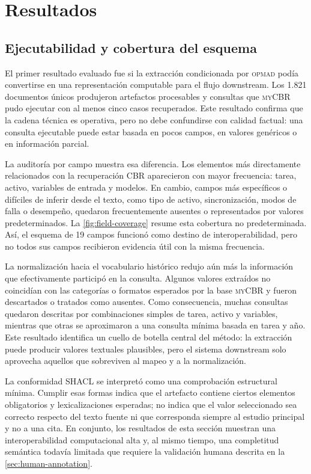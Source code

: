 \documentclass[11pt,a4paper]{article}
\newcommand{\OPMAD}{\textsc{opmad}}
\newcommand{\myCBR}{\textsc{myCBR}}
\begin{document}
\section{Resultados}
\label{sec:results}

\subsection{Ejecutabilidad y cobertura del esquema}

El primer resultado evaluado fue si la extracción condicionada por \OPMAD{} podía convertirse en una representación computable para el flujo downstream. Los 1.821 documentos únicos produjeron artefactos procesables y consultas que \myCBR{} pudo ejecutar con al menos cinco casos recuperados. Este resultado confirma que la cadena técnica es operativa, pero no debe confundirse con calidad factual: una consulta ejecutable puede estar basada en pocos campos, en valores genéricos o en información parcial.

La auditoría por campo muestra esa diferencia. Los elementos más directamente relacionados con la recuperación CBR aparecieron con mayor frecuencia: tarea, activo, variables de entrada y modelos. En cambio, campos más específicos o difíciles de inferir desde el texto, como tipo de activo, sincronización, modos de falla o desempeño, quedaron frecuentemente ausentes o representados por valores predeterminados. La \cref{fig:field-coverage} resume esta cobertura no predeterminada. Así, el esquema de 19 campos funcionó como destino de interoperabilidad, pero no todos sus campos recibieron evidencia útil con la misma frecuencia.

La normalización hacia el vocabulario histórico redujo aún más la información que efectivamente participó en la consulta. Algunos valores extraídos no coincidían con las categorías o formatos esperados por la base \myCBR{} y fueron descartados o tratados como ausentes. Como consecuencia, muchas consultas quedaron descritas por combinaciones simples de tarea, activo y variables, mientras que otras se aproximaron a una consulta mínima basada en tarea y año. Este resultado identifica un cuello de botella central del método: la extracción puede producir valores textuales plausibles, pero el sistema downstream solo aprovecha aquellos que sobreviven al mapeo y a la normalización.

La conformidad SHACL se interpretó como una comprobación estructural mínima. Cumplir esas formas indica que el artefacto contiene ciertos elementos obligatorios y lexicalizaciones esperadas; no indica que el valor seleccionado sea correcto respecto del texto fuente ni que corresponda siempre al estudio principal y no a una cita. En conjunto, los resultados de esta sección muestran una interoperabilidad computacional alta y, al mismo tiempo, una completitud semántica todavía limitada que requiere la validación humana descrita en la \cref{sec:human-annotation}.
\end{document}
